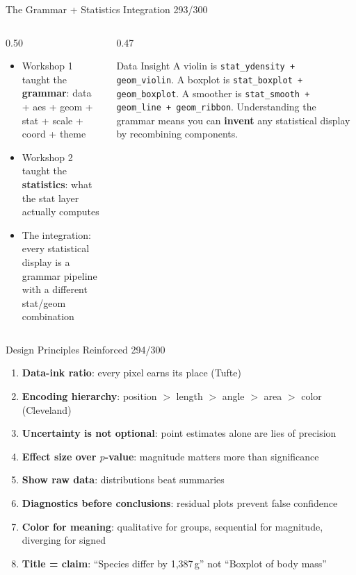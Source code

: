 \documentclass[10pt]{beamer}
\newcommand{\smark}[1]{\hfill{\scriptsize\color{codegray}#1}}
\begin{document}
\begin{frame}{The Grammar + Statistics Integration}
\smark{293/300}
\begin{columns}[T]
\begin{column}{0.50\textwidth}
\begin{itemize}
    \item Workshop 1 taught the \textbf{grammar}: data + aes + geom + stat + scale + coord + theme
    \item Workshop 2 taught the \textbf{statistics}: what the stat layer actually computes
    \item The integration: every statistical display is a grammar pipeline with a different stat/geom combination
\end{itemize}
\end{column}
\begin{column}{0.47\textwidth}
\begin{exampleblock}{Data Insight}
    \scriptsize A violin is \texttt{stat\_ydensity + geom\_violin}. A boxplot is \texttt{stat\_boxplot + geom\_boxplot}. A smoother is \texttt{stat\_smooth + geom\_line + geom\_ribbon}. Understanding the grammar means you can \textbf{invent} any statistical display by recombining components.
\end{exampleblock}
\end{column}
\end{columns}
\end{frame}

\begin{frame}{Design Principles Reinforced}
\smark{294/300}
\begin{enumerate}
    \item \textbf{Data-ink ratio}: every pixel earns its place (Tufte)
    \item \textbf{Encoding hierarchy}: position $>$ length $>$ angle $>$ area $>$ color (Cleveland)
    \item \textbf{Uncertainty is not optional}: point estimates alone are lies of precision
    \item \textbf{Effect size over $p$-value}: magnitude matters more than significance
    \item \textbf{Show raw data}: distributions beat summaries
    \item \textbf{Diagnostics before conclusions}: residual plots prevent false confidence
    \item \textbf{Color for meaning}: qualitative for groups, sequential for magnitude, diverging for signed
    \item \textbf{Title = claim}: ``Species differ by 1,387\,g'' not ``Boxplot of body mass''
\end{enumerate}
\end{frame}
\end{document}
